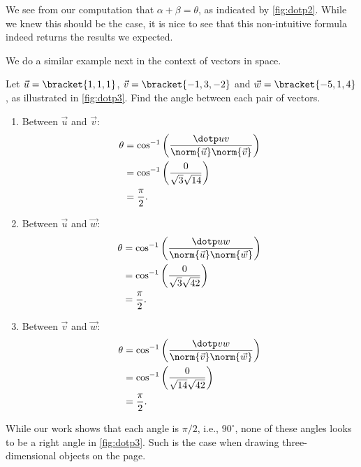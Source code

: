 We see from our computation that $\alpha + \beta = \theta$, as indicated by \autoref{fig:dotp2}. While we knew this should be the case, it is nice to see that this non-intuitive formula indeed returns the results we expected.

We do a similar example next in the context of vectors in space.


\begin{example}\label{ex_dotp3}
Let $\vec u = \bracket{1,1,1}$, $\vec v = \bracket{-1,3,-2}$ and $\vec w = \bracket{-5,1,4}$, as illustrated in \autoref{fig:dotp3}. Find the angle between each pair of vectors.
\solution
\begin{enumerate}
	\item Between $\vec u$ and $\vec v$:
	\begin{align*}
		\theta &= \cos^{-1}\left(\frac{\dotp uv}{\norm{\vec u}\norm{\vec v}}\right)\\
		&= \cos^{-1}\left(\frac{0}{\sqrt{3}\sqrt{14}}\right)\\
		&= \frac{\pi}2.
	\end{align*}
	\item	Between $\vec u$ and $\vec w$:
	\begin{align*}
		\theta &= \cos^{-1}\left(\frac{\dotp uw}{\norm{\vec u}\norm{\vec w}}\right)\\
		&= \cos^{-1}\left(\frac{0}{\sqrt{3}\sqrt{42}}\right)\\
		&= \frac{\pi}2.
	\end{align*}
	\item	Between $\vec v$ and $\vec w$:
	\begin{align*}
		\theta &= \cos^{-1}\left(\frac{\dotp vw}{\norm{\vec v}\norm{\vec w}}\right)\\
		&= \cos^{-1}\left(\frac{0}{\sqrt{14}\sqrt{42}}\right)\\
		&= \frac{\pi}2.
	\end{align*}
\end{enumerate}
While our work shows that each angle is $\pi/2$, i.e.,  $90^\circ$, none of these angles looks to be a right angle in \autoref{fig:dotp3}. Such is the case when drawing three-dimensional objects on the page.
\end{example}

